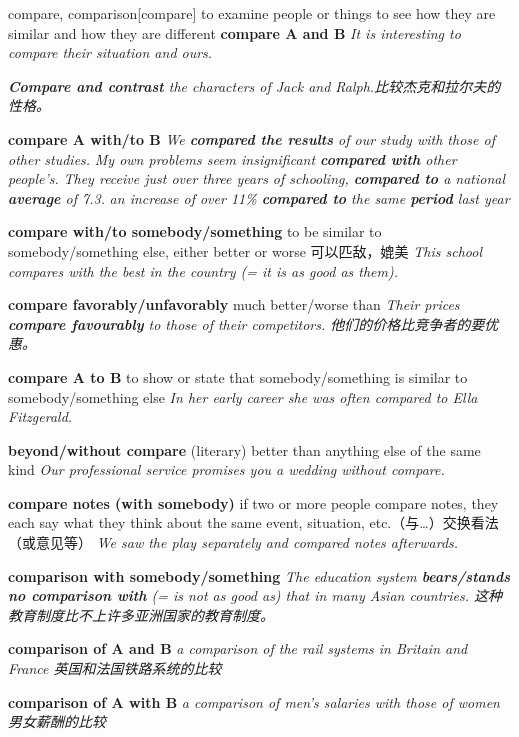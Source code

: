 \begin{DefWord}{compare, comparison}[compare]
    to examine people or things to see how they are similar and how they are different
    \textbf{compare A and B} \textit{It is interesting to compare their situation and ours.}

    \textit{\textbf{Compare and contrast} the characters of Jack and Ralph.比较杰克和拉尔夫的性格。}

    \textbf{compare A with/to B} 
    \textit{We \textbf{compared the results} of our study with those of other studies.}
    \textit{My own problems seem insignificant \textbf{compared with} other people's.}
    \textit{They receive just over three years of schooling, \textbf{compared to} a national \textbf{average} of 7.3.}
    \textit{an increase of over 11\% \textbf{compared to} the same \textbf{period} last year}

    \textbf{compare with/to somebody/something} to be similar to somebody/something else, either better or worse 可以匹敌，媲美
    \textit{This school compares with the best in the country (= it is as good as them).}

    \textbf{compare favorably/unfavorably} much better/worse than
    \textit{Their prices \textbf{compare favourably} to those of their competitors. 他们的价格比竞争者的要优惠。}



    \textbf{compare A to B} to show or state that somebody/something is similar to somebody/something else
    \textit{In her early career she was often compared to Ella Fitzgerald.}

    \textbf{beyond/without compare}
    (literary) better than anything else of the same kind
    \textit{Our professional service promises you a wedding without compare.}

    \textbf{compare notes (with somebody)}  
    if two or more people compare notes, they each say what they think about the same event, situation, etc.（与…）交换看法（或意见等）
    \textit{We saw the play separately and compared notes afterwards.}


    \textbf{comparison with somebody/something}
    \textit{The education system \textbf{bears/stands no comparison with} (= is not as good as) that in many Asian countries. 这种教育制度比不上许多亚洲国家的教育制度。}

    \textbf{comparison of A and B} \textit{a comparison of the rail systems in Britain and France 英国和法国铁路系统的比较}

    \textbf{comparison of A with B} \textit{a comparison of men's salaries with those of women 男女薪酬的比较}


\end{DefWord}
